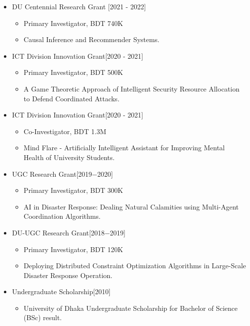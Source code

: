 \documentclass{article}
\begin{document}
\begin{itemize}
\item DU Centennial Research Grant  \hfill [2021 - 2022]
    \begin{itemize}
    \item Primary Investigator, BDT 740K
    \item Causal Inference and Recommender Systems.
    \end{itemize}


\item ICT Division Innovation Grant\hfill [2020 - 2021]
    \begin{itemize}
    \item Primary Investigator, BDT 500K
    \item A Game Theoretic Approach of Intelligent Security Resource Allocation to Defend Coordinated Attacks.
    \end{itemize}

\item ICT Division Innovation Grant\hfill [2020 - 2021]
    \begin{itemize}
    \item Co-Investigator, BDT 1.3M
    \item Mind Flare - Artificially Intelligent Assistant for Improving Mental Health of University Students.
    \end{itemize}
    
\item UGC Research Grant\hfill [2019$-$2020]
    \begin{itemize}
    \item Primary Investigator, BDT 300K
    \item AI in Disaster Response: Dealing Natural Calamities using Multi-Agent Coordination Algorithms.
    \end{itemize}    
\item DU-UGC Research Grant\hfill [2018$-$2019]
    \begin{itemize}
    \item Primary Investigator, BDT 120K
    \item Deploying Distributed Constraint Optimization Algorithms in Large-Scale Disaster Response Operation.
    \end{itemize}    
    
\item Undergraduate Scholarship\hfill [2010]
    \begin{itemize}
    \item University of Dhaka Undergraduate Scholarship for Bachelor of Science (BSc) result.
    \end{itemize}    


\end{itemize}
\end{document}
